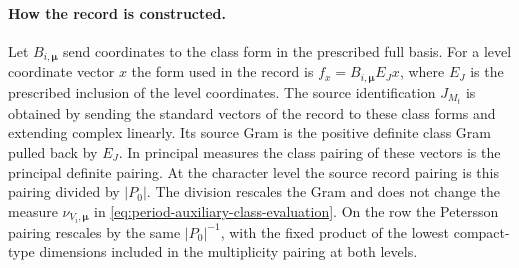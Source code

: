 \paragraph{How the record is constructed.}
Let \(B_{i,\boldsymbol\mu}\) send coordinates to the class form
in the prescribed full basis.
For a level coordinate vector \(x\) the form used in the record
is \(f_x=B_{i,\boldsymbol\mu}E_J x\), where \(E_J\) is the
prescribed inclusion of the level coordinates. The source
identification \(J_{M_t}\) is obtained by sending the standard
vectors of the record to these class forms and extending
complex linearly. Its source Gram is the positive definite
class Gram pulled back by \(E_J\). In principal measures the
class pairing of these vectors is the principal definite
pairing. At the character level the source record pairing is
this pairing divided by \(|P_0|\). The division rescales the
Gram and does not change the measure \(\nu_{V_i,\boldsymbol\mu}\)
in \eqref{eq:period-auxiliary-class-evaluation}. On the row
the Petersson pairing rescales by the same \(|P_0|^{-1}\),
with the fixed product of the lowest compact-type dimensions
included in the multiplicity pairing at both levels.

